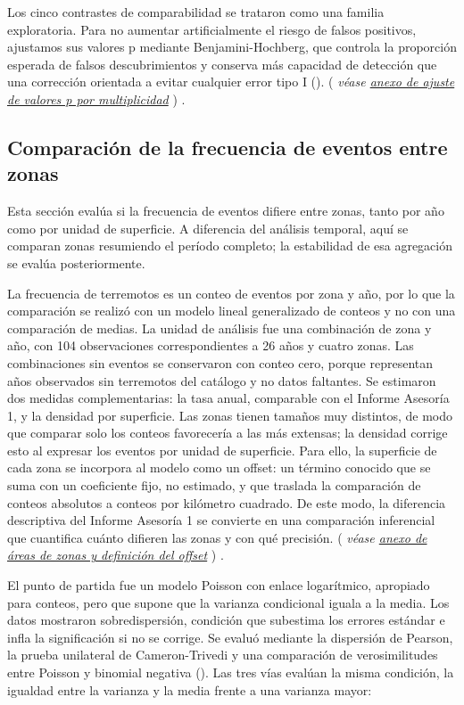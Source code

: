 \documentclass[
  spanish,
  letterpaper,
  DIV=11,
  numbers=noendperiod]{scrartcl}
\newcommand{\asesoriaParenRef}[1]{%
  \textnormal{\textcolor{asesoriaTextColor}{(}}%
  {\hypersetup{linkcolor=asesoriaLinkColor,urlcolor=asesoriaLinkColor,citecolor=asesoriaLinkColor}\textcolor{asesoriaTextColor}{\emph{#1}}}%
  \textnormal{\textcolor{asesoriaTextColor}{)}}%
}
\begin{document}
Los cinco contrastes de comparabilidad se trataron como una familia
exploratoria. Para no aumentar artificialmente el riesgo de falsos
positivos, ajustamos sus valores p mediante Benjamini-Hochberg, que
controla la proporción esperada de falsos descubrimientos y conserva más
capacidad de detección que una corrección orientada a evitar cualquier
error tipo I ().
\asesoriaParenRef{véase \hyperref[sec-anexo-ajuste-p]{anexo de ajuste de valores p por multiplicidad}}.

\subsection{Comparación de la frecuencia de eventos entre
zonas}\label{sec-met-frecuencia}

Esta sección evalúa si la frecuencia de eventos difiere entre zonas,
tanto por año como por unidad de superficie. A diferencia del análisis
temporal, aquí se comparan zonas resumiendo el período completo; la
estabilidad de esa agregación se evalúa posteriormente.

La frecuencia de terremotos es un conteo de eventos por zona y año, por
lo que la comparación se realizó con un modelo lineal generalizado de
conteos y no con una comparación de medias. La unidad de análisis fue
una combinación de zona y año, con 104 observaciones correspondientes a
26 años y cuatro zonas. Las combinaciones sin eventos se conservaron con
conteo cero, porque representan años observados sin terremotos del
catálogo y no datos faltantes. Se estimaron dos medidas complementarias:
la tasa anual, comparable con el Informe Asesoría 1, y la densidad por
superficie. Las zonas tienen tamaños muy distintos, de modo que comparar
solo los conteos favorecería a las más extensas; la densidad corrige
esto al expresar los eventos por unidad de superficie. Para ello, la
superficie de cada zona se incorpora al modelo como un offset: un
término conocido que se suma con un coeficiente fijo, no estimado, y que
traslada la comparación de conteos absolutos a conteos por kilómetro
cuadrado. De este modo, la diferencia descriptiva del Informe Asesoría 1
se convierte en una comparación inferencial que cuantifica cuánto
difieren las zonas y con qué precisión.
\asesoriaParenRef{véase \hyperref[sec-anexo-areas]{anexo de áreas de zonas y definición del offset}}.

El punto de partida fue un modelo Poisson con enlace logarítmico,
apropiado para conteos, pero que supone que la varianza condicional
iguala a la media. Los datos mostraron sobredispersión, condición que
subestima los errores estándar e infla la significación si no se
corrige. Se evaluó mediante la dispersión de Pearson, la prueba
unilateral de Cameron-Trivedi y una comparación de verosimilitudes entre
Poisson y binomial negativa (). Las tres vías evalúan la misma condición, la igualdad
entre la varianza y la media frente a una varianza mayor:
\end{document}
